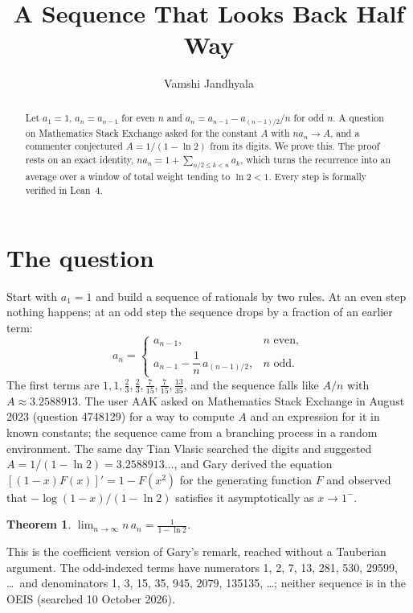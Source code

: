 \documentclass[11pt]{amsart}
\title{A Sequence That Looks Back Half Way}
\author{Vamshi Jandhyala}
\newtheorem{theorem}{Theorem}
\theoremstyle{remark}
\begin{document}
\begin{abstract}
Let $a_1=1$, $a_n=a_{n-1}$ for even $n$ and $a_n=a_{n-1}-a_{(n-1)/2}/n$ for odd $n$. A question on Mathematics Stack Exchange asked for the constant $A$ with $na_n\to A$, and a commenter conjectured $A=1/(1-\ln2)$ from its digits. We prove this. The proof rests on an exact identity, $na_n=1+\sum_{n/2\le k<n}a_k$, which turns the recurrence into an average over a window of total weight tending to $\ln2<1$. Every step is formally verified in Lean~4.
\end{abstract}

\maketitle

\section{The question}

Start with $a_1=1$ and build a sequence of rationals by two rules. At an even step nothing happens; at an odd step the sequence drops by a fraction of an earlier term:
\[
a_n=\begin{cases} a_{n-1}, & n\text{ even},\\[2pt] a_{n-1}-\dfrac1n\,a_{(n-1)/2}, & n\text{ odd}.\end{cases}
\]
The first terms are $1,1,\tfrac23,\tfrac23,\tfrac7{15},\tfrac7{15},\tfrac{13}{35}$, and the sequence falls like $A/n$ with $A\approx3.2588913$. The user AAK asked on Mathematics Stack Exchange in August 2023 (question 4748129) for a way to compute $A$ and an expression for it in known constants; the sequence came from a branching process in a random environment. The same day Tian Vlasic searched the digits and suggested $A=1/(1-\ln2)=3.2588913\ldots$, and Gary derived the equation $[(1-x)F(x)]'=1-F(x^2)$ for the generating function $F$ and observed that $-\log(1-x)/(1-\ln2)$ satisfies it asymptotically as $x\to1^-$.

\begin{theorem}\label{thm:main}
$\displaystyle\lim_{n\to\infty}n\,a_n=\frac1{1-\ln2}$.
\end{theorem}

This is the coefficient version of Gary's remark, reached without a Tauberian argument. The odd-indexed terms have numerators 1, 2, 7, 13, 281, 530, 29599, \dots\ and denominators 1, 3, 15, 35, 945, 2079, 135135, \dots; neither sequence is in the OEIS (searched 10 October 2026).
\end{document}
